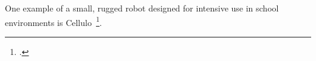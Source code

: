 \documentclass[11pt,a4paper]{report}
\begin{document}
One example of a small, rugged robot designed for intensive use in school
environments is Cellulo~\footcite{ozgur2017cellulo}.
%
%
\end{document}
